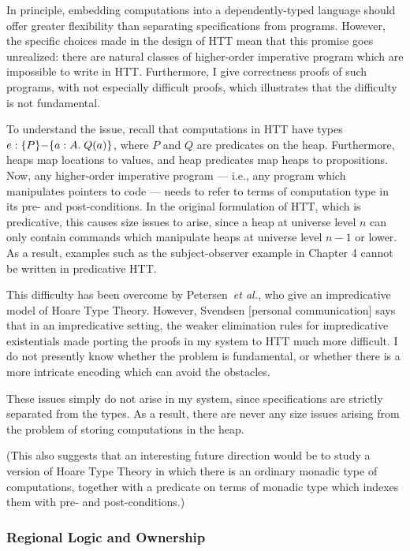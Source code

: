 In principle, embedding computations into a dependently-typed language
should offer greater flexibility than separating specifications from
programs. However, the specific choices made in the design of HTT mean
that this promise goes unrealized: there are natural classes of
higher-order imperative program which are impossible to write in
HTT. Furthermore, I give correctness proofs of such programs, with not
especially difficult proofs, which illustrates that the difficulty is
not fundamental.

To understand the issue, recall that computations in HTT have types $e
: \{{P}\}{-}\{{a:A}.\;{Q(a)}\}$, where $P$ and $Q$ are predicates on the
heap. Furthermore, heaps map locations to values, and heap predicates
map heaps to propositions. Now, any higher-order imperative program
--- i.e., any program which manipulates pointers to code --- needs to
refer to terms of computation type in its pre- and post-conditions.
In the original formulation of HTT, which is predicative, this causes
size issues to arise, since a heap at universe level $n$ can only
contain commands which manipulate heaps at universe level $n-1$ or
lower. As a result, examples such as the subject-observer example in
Chapter 4 cannot be written in predicative HTT.

This difficulty has been overcome by Petersen~\emph{et al.}, who give
an impredicative model of Hoare Type Theory. However, Svendsen
[personal communication] says that in an impredicative setting, the
weaker elimination rules for impredicative existentials made porting
the proofs in my system to HTT much more difficult. I do not presently
know whether the problem is fundamental, or whether there is a more
intricate encoding which can avoid the obstacles.
 
These issues simply do not arise in my system, since specifications
are strictly separated from the types. As a result, there are never
any size issues arising from the problem of storing computations in
the heap. 

(This also suggests that an interesting future direction would be to
study a version of Hoare Type Theory in which there is an ordinary
monadic type of computations, together with a predicate on terms of
monadic type which indexes them with pre- and post-conditions.)

\subsubsection{Regional Logic and Ownership}

